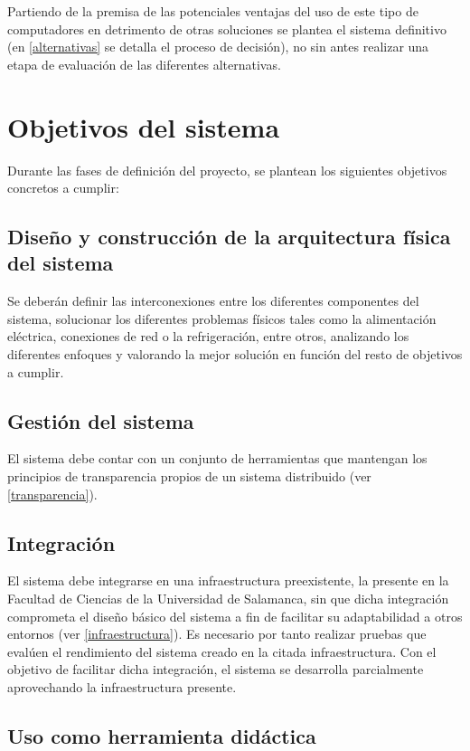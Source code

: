 Partiendo de la premisa de las potenciales ventajas del uso de este tipo de computadores en detrimento de otras soluciones se plantea el sistema definitivo (en \ref{alternativas} se detalla el proceso de decisión), no sin antes realizar una etapa de evaluación de las diferentes alternativas.

\section{Objetivos del sistema}

Durante las fases de definición del proyecto, se plantean los siguientes objetivos concretos a cumplir:

\subsection{Diseño y construcción de la arquitectura física del sistema}

Se deberán definir las interconexiones entre los diferentes componentes del sistema, solucionar los diferentes problemas físicos tales como la alimentación eléctrica, conexiones de red o la refrigeración, entre otros, analizando los diferentes enfoques y valorando la mejor solución en función del resto de objetivos a cumplir.

\subsection{Gestión del sistema}

El sistema debe contar con un conjunto de herramientas que mantengan los principios de transparencia propios de un sistema distribuido (ver \ref{transparencia}).

\subsection{Integración}

El sistema debe integrarse en una infraestructura preexistente, la presente en la Facultad de Ciencias de la Universidad de Salamanca, sin que dicha integración comprometa el diseño básico del sistema a fin de facilitar su adaptabilidad a otros entornos (ver \ref{infraestructura}). Es necesario por tanto realizar pruebas que evalúen el rendimiento del sistema creado en la citada infraestructura. Con el objetivo de facilitar dicha integración, el sistema se desarrolla parcialmente aprovechando la infraestructura presente.

\subsection{Uso como herramienta didáctica}


